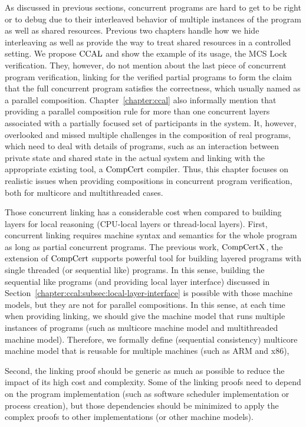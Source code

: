 As discussed in previous sections,  concurrent programs are hard to get to be right or to debug due to their interleaved behavior of multiple instances of the program as well as shared resources. 
Previous two chapters handle how we hide interleaving as well as provide the way to treat shared resources in a controlled setting. 
We propose  $\mathrm{CCAL}$ and show the example of its usage, the MCS Lock verification.
They, however, do not mention about the last piece of concurrent program verification, 
linking for the verified partial programs to form the claim that the full concurrent program satisfies the correctness, 
which usually named as a parallel composition. 
Chapter~\ref{chapter:ccal} also informally mention that providing a  parallel composition rule for more than one
concurrent layers associated with a partially focused set of participants in the system. 
It, however, overlooked and missed multiple challenges in the composition of real programs,
which need to deal with details of programs, 
such as an interaction between private state and shared state in the actual system and linking with the appropriate existing tool, a $\mathrm{CompCert}$ compiler. 
Thus, this chapter focuses on realistic issues when providing compositions in concurrent program verification,
both for multicore and multithreaded cases.

Those concurrent linking has a considerable cost when compared to building layers for local reasoning (CPU-local layers or thread-local layers).
First,  concurrent linking requires machine syntax and semantics 
for the whole program as long as partial concurrent programs.
The previous work, $\mathrm{CompCertX}$, the extension of $\mathrm{CompCert}$
supports powerful tool for building layered programs with single threaded (or sequential like) programs.
In this sense, 
building the sequential like programs (and providing local layer interface) discussed in Section~\ref{chapter:ccal:subsec:local-layer-interface} 
is possible with those machine models,
but they are not for parallel compositions. 
In this sense, at each time when providing linking, 
we should give the machine model that runs multiple instances of programs
(such as multicore machine model and multithreaded machine model). 
Therefore, we  formally define (sequential consistency) multicore machine model that is reusable for multiple 
machines (such as ARM and x86), 

Second,  
the linking proof should be generic as much as possible to reduce the impact of its high cost and complexity. 
Some of the linking proofs need to depend
on the program implementation (such as software scheduler implementation or process creation), 
but those dependencies should be minimized to apply the complex proofs to other implementations (or other machine models). 


